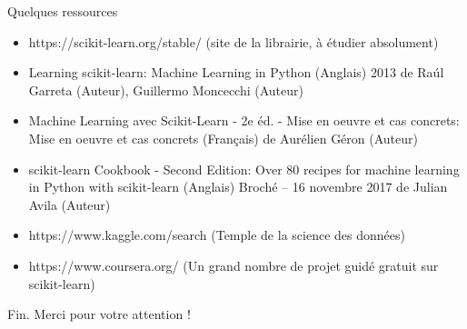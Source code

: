 \documentclass[9pt]{beamer}
\begin{document}
\begin{frame}{Quelques ressources}
\begin{itemize}
    \item https://scikit-learn.org/stable/ (site de la librairie, à étudier absolument)
    \item Learning scikit-learn: Machine Learning in Python (Anglais) 2013 de Raúl Garreta (Auteur), Guillermo Moncecchi (Auteur)
    \item  Machine Learning avec Scikit-Learn - 2e éd. - Mise en oeuvre et cas concrets: Mise en oeuvre et cas concrets (Français) de Aurélien Géron (Auteur)
    \item scikit-learn Cookbook - Second Edition: Over 80 recipes for machine learning in Python with scikit-learn (Anglais) Broché – 16 novembre 2017 de Julian Avila (Auteur)
    \item https://www.kaggle.com/search (Temple de la science des données)
    \item https://www.coursera.org/ (Un grand nombre de projet guidé gratuit sur scikit-learn)


\end{itemize}
\end{frame}


\begin{frame}
\huge{\centerline{Fin. Merci pour votre attention !}}
\end{frame}
\end{document}
